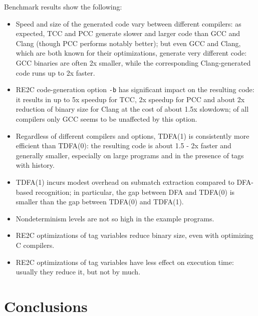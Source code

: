 \documentclass{article}
\theoremstyle{definition}
\begin{document}
\begin{multicols}{2}

Benchmark results show the following:

\begin{itemize}
    \setlength{\parskip}{0.5em}

    \item Speed and size of the generated code vary between different compilers:
        as expected, TCC and PCC generate slower and larger code than GCC and Clang (though PCC performs notably better);
        but even GCC and Clang, which are both known for their optimizations, generate very different code:
        GCC binaries are often 2x smaller, while the corresponding Clang-generated code runs up to 2x faster.

    \item RE2C code-generation option \texttt{-b} has significant impact on the resulting code:
        it results in up to 5x speedup for TCC, 2x speedup for PCC and about 2x reduction of binary size for Clang at the cost of about 1.5x slowdown;
        of all compilers only GCC seems to be unaffected by this option.

    \item Regardless of different compilers and options, TDFA(1) is consistently more efficient than TDFA(0):
        the resulting code is about 1.5 - 2x faster and generally smaller,
        especially on large programs and in the presence of tags with history.

    \item TDFA(1) incurs modest overhead on submatch extraction compared to DFA-based recognition;
        in particular, the gap between DFA and TDFA(0) is smaller than the gap between TDFA(0) and TDFA(1).

    \item Nondeterminism levels are not so high in the example programs.

    \item RE2C optimizations of tag variables reduce binary size, even with optimizing C compilers.

    \item RE2C optimizations of tag variables have less effect on execution time: usually they reduce it, but not by much.
    \\
\end{itemize}


\section{Conclusions}\label{section_conclusions}


\end{multicols}
\end{document}
